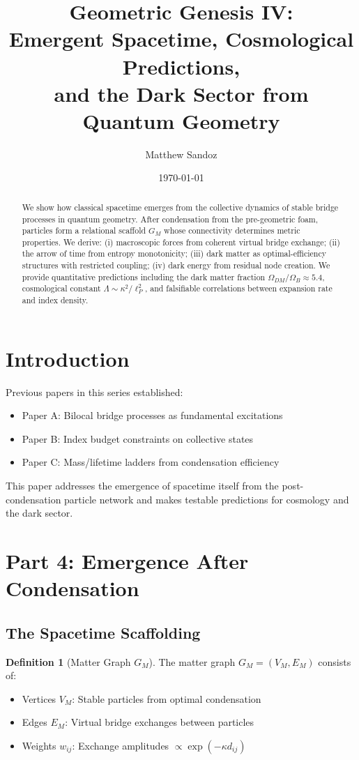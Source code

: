 \documentclass[11pt]{article}
\title{Geometric Genesis IV: \\ Emergent Spacetime, Cosmological Predictions, \\ and the Dark Sector from Quantum Geometry}
\author{Matthew Sandoz}
\date{\today}
\theoremstyle{plain}
\theoremstyle{definition}
\newtheorem{definition}[theorem]{Definition}
\begin{document}
\maketitle

\begin{abstract}
  We show how classical spacetime emerges from the collective dynamics of stable bridge processes in quantum geometry. After condensation from the pre-geometric foam, particles form a relational scaffold $G_M$ whose connectivity determines metric properties. We derive: (i) macroscopic forces from coherent virtual bridge exchange; (ii) the arrow of time from entropy monotonicity; (iii) dark matter as optimal-efficiency structures with restricted coupling; (iv) dark energy from residual node creation. We provide quantitative predictions including the dark matter fraction $\Omega_{DM}/\Omega_B \approx 5.4$, cosmological constant $\Lambda \sim \kappa^2/\ell_P^2$, and falsifiable correlations between expansion rate and index density.
\end{abstract}

\section{Introduction}
\label{sec:intro}

Previous papers in this series established:
\begin{itemize}
  \item Paper A: Bilocal bridge processes as fundamental excitations
  \item Paper B: Index budget constraints on collective states
  \item Paper C: Mass/lifetime ladders from condensation efficiency
\end{itemize}

This paper addresses the emergence of spacetime itself from the post-condensation particle network and makes testable predictions for cosmology and the dark sector.

\section{Part 4: Emergence After Condensation}
\label{sec:emergence}

\subsection{The Spacetime Scaffolding}

\begin{definition}[Matter Graph $G_M$]
  The matter graph $G_M = (V_M, E_M)$ consists of:
  \begin{itemize}
    \item Vertices $V_M$: Stable particles from optimal condensation
    \item Edges $E_M$: Virtual bridge exchanges between particles
    \item Weights $w_{ij}$: Exchange amplitudes $\propto \exp(-\kappa d_{ij})$
  \end{itemize}
\end{definition}
\end{document}

